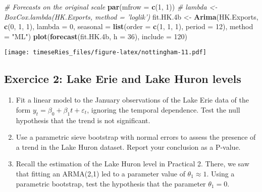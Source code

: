 \documentclass[]{book}
\newenvironment{Shaded}{\begin{snugshade}}{\end{snugshade}}
\newcommand{\KeywordTok}[1]{\textcolor[rgb]{0.13,0.29,0.53}{\textbf{#1}}}
\newcommand{\DataTypeTok}[1]{\textcolor[rgb]{0.13,0.29,0.53}{#1}}
\newcommand{\DecValTok}[1]{\textcolor[rgb]{0.00,0.00,0.81}{#1}}
\newcommand{\StringTok}[1]{\textcolor[rgb]{0.31,0.60,0.02}{#1}}
\newcommand{\CommentTok}[1]{\textcolor[rgb]{0.56,0.35,0.01}{\textit{#1}}}
\newcommand{\NormalTok}[1]{#1}
\providecommand{\tightlist}{%
  \setlength{\itemsep}{0pt}\setlength{\parskip}{0pt}}
\begin{document}
\begin{Shaded}
\begin{Highlighting}[]
\CommentTok{# Forecasts on the original scale}
\KeywordTok{par}\NormalTok{(}\DataTypeTok{mfrow =} \KeywordTok{c}\NormalTok{(}\DecValTok{1}\NormalTok{, }\DecValTok{1}\NormalTok{))}
\CommentTok{# lambda <- BoxCox.lambda(HK.Exports, method = 'loglik')}
\NormalTok{fit.HK.4b <-}\StringTok{ }\KeywordTok{Arima}\NormalTok{(HK.Exports, }\KeywordTok{c}\NormalTok{(}\DecValTok{0}\NormalTok{, }\DecValTok{1}\NormalTok{, }\DecValTok{1}\NormalTok{), }\DataTypeTok{lambda =} \DecValTok{0}\NormalTok{, }\DataTypeTok{seasonal =} \KeywordTok{list}\NormalTok{(}\DataTypeTok{order =} \KeywordTok{c}\NormalTok{(}\DecValTok{1}\NormalTok{, }
    \DecValTok{1}\NormalTok{, }\DecValTok{1}\NormalTok{), }\DataTypeTok{period =} \DecValTok{12}\NormalTok{), }\DataTypeTok{method =} \StringTok{"ML"}\NormalTok{)}
\KeywordTok{plot}\NormalTok{(}\KeywordTok{forecast}\NormalTok{(fit.HK.4b, }\DataTypeTok{h =} \DecValTok{36}\NormalTok{), }\DataTypeTok{include =} \DecValTok{120}\NormalTok{)}
\end{Highlighting}
\end{Shaded}

\texttt{[image: timeseRies\_files/figure-latex/nottingham-11.pdf]}

\subsection{Exercice 2: Lake Erie and Lake Huron
levels}\label{exercice-2-lake-erie-and-lake-huron-levels-1}

\begin{enumerate}
\def\labelenumi{\arabic{enumi}.}
\tightlist
\item
  Fit a linear model to the January observations of the Lake Erie data
  of the form \(y_t=\beta_0+\beta_1t+\varepsilon_t\), ignoring the
  temporal dependence. Test the null hypothesis that the trend is not
  significant.
\item
  Use a parametric sieve bootstrap with normal errors to assess the
  presence of a trend in the Lake Huron dataset. Report your conclusion
  as a P-value.
\item
  Recall the estimation of the Lake Huron level in Practical 2. There,
  we saw that fitting an ARMA(2,1) led to a parameter value of
  \(\theta_1 \approx 1\). Using a parametric bootstrap, test the
  hypothesis that the parameter \(\theta_1=0\).
\end{enumerate}
\end{document}
